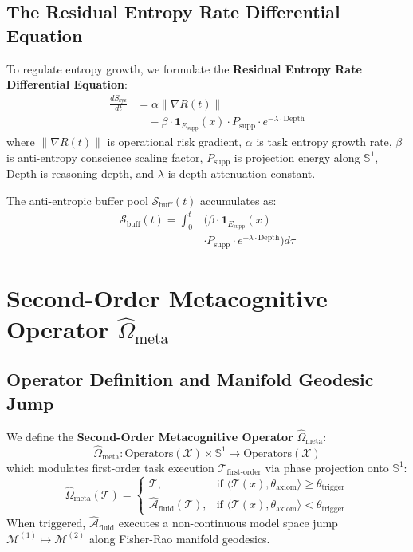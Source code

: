 \documentclass[journal,twocolumn,10pt]{IEEEtran}
\begin{document}
\subsection{The Residual Entropy Rate Differential Equation}
To regulate entropy growth, we formulate the \textbf{Residual Entropy Rate Differential Equation}:
\begin{equation}
\begin{aligned}
\frac{dS_{\text{sys}}}{dt} &= \alpha \|\nabla R(t)\| \\
&\quad - \beta \cdot \mathbf{1}_{E_{\text{supp}}}(x) \cdot P_{\text{supp}} \cdot e^{-\lambda \cdot \text{Depth}}
\end{aligned}
\label{eq:residual_entropy}
\end{equation}
where $\|\nabla R(t)\|$ is operational risk gradient, $\alpha$ is task entropy growth rate, $\beta$ is anti-entropy conscience scaling factor, $P_{\text{supp}}$ is projection energy along $\mathbb{S}^1$, $\text{Depth}$ is reasoning depth, and $\lambda$ is depth attenuation constant.

The anti-entropic buffer pool $\mathcal{S}_{\text{buff}}(t)$ accumulates as:
\begin{equation}
\begin{aligned}
\mathcal{S}_{\text{buff}}(t) = \int_{0}^{t} &\Big( \beta \cdot \mathbf{1}_{E_{\text{supp}}}(x) \\
&\cdot P_{\text{supp}} \cdot e^{-\lambda \cdot \text{Depth}} \Big) d\tau
\end{aligned}
\end{equation}

\section{Second-Order Metacognitive Operator $\hat{\Omega}_{\text{meta}}$}
\subsection{Operator Definition and Manifold Geodesic Jump}
We define the \textbf{Second-Order Metacognitive Operator} $\hat{\Omega}_{\text{meta}}$:
\begin{equation}
\hat{\Omega}_{\text{meta}}: \text{Operators}(\mathcal{X}) \times \mathbb{S}^1 \mapsto \text{Operators}(\mathcal{X})
\end{equation}
which modulates first-order task execution $\mathcal{T}_{\text{first-order}}$ via phase projection onto $\mathbb{S}^1$:
\begin{equation}
\hat{\Omega}_{\text{meta}}(\mathcal{T}) = 
\begin{cases} 
\mathcal{T}, & \text{if } \langle \mathcal{T}(x), \theta_{\text{axiom}} \rangle \ge \theta_{\text{trigger}} \\ 
\hat{\mathcal{A}}_{\text{fluid}}(\mathcal{T}), & \text{if } \langle \mathcal{T}(x), \theta_{\text{axiom}} \rangle < \theta_{\text{trigger}} 
\end{cases}
\end{equation}
When triggered, $\hat{\mathcal{A}}_{\text{fluid}}$ executes a non-continuous model space jump $\mathcal{M}^{(1)} \mapsto \mathcal{M}^{(2)}$ along Fisher-Rao manifold geodesics.
\end{document}
